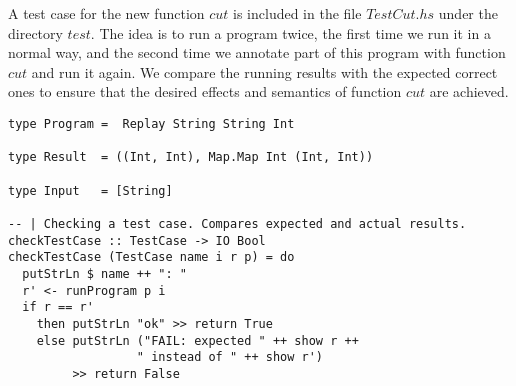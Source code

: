 \documentclass[10pt]{article}
\begin{document}
A test case for the new function $cut$ is included in the file $TestCut.hs$ under the directory $test$. The idea is to run a program twice, the first time we run it in a normal way, and the second time we annotate part of this program with function $cut$ and run it again. We compare the running results with the expected correct ones to ensure that the desired effects and semantics of function $cut$ are achieved.
\begin{lstlisting}
type Program =  Replay String String Int                                                                                                                                                      
                                                                                                                                                                                              
type Result  = ((Int, Int), Map.Map Int (Int, Int))                                                                                                                                           
                                                                                                                                                                                              
type Input   = [String]

-- | Checking a test case. Compares expected and actual results.                                                                                                                              
checkTestCase :: TestCase -> IO Bool                                                                                                                                                          
checkTestCase (TestCase name i r p) = do                                                                                                                                                      
  putStrLn $ name ++ ": "                                                                                                                                                                     
  r' <- runProgram p i                                                                                                                                                                        
  if r == r'                                                                                                                                                                                  
    then putStrLn "ok" >> return True                                                                                                                                                         
    else putStrLn ("FAIL: expected " ++ show r ++                                                                                                                                             
                  " instead of " ++ show r')                                                                                                                                                  
         >> return False
         

\end{lstlisting}
\end{document}
